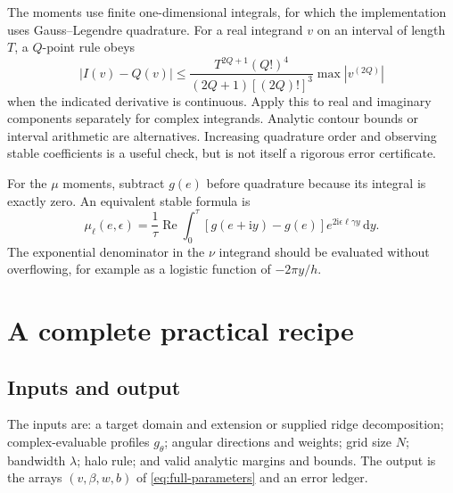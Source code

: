 \documentclass[11pt]{article}
\newcommand{\ii}{\mathrm i}
\newcommand{\dd}{\,\mathrm d}
\newcommand{\Real}{\operatorname{Re}}
\begin{document}
The moments use finite one-dimensional integrals, for which the implementation uses Gauss--Legendre quadrature. For a real integrand $v$ on an interval of length $T$, a $Q$-point rule obeys
\[
 |I(v)-Q(v)|\le
 \frac{T^{2Q+1}(Q!)^4}{(2Q+1)[(2Q)!]^3}
 \max|v^{(2Q)}|
\]
when the indicated derivative is continuous. Apply this to real and imaginary components separately for complex integrands. Analytic contour bounds or interval arithmetic are alternatives. Increasing quadrature order and observing stable coefficients is a useful check, but is not itself a rigorous error certificate.

For the $\mu$ moments, subtract $g(e)$ before quadrature because its integral is exactly zero. An equivalent stable formula is
\[
 \mu_\ell(e,\epsilon)=\frac1\tau\Real\int_0^\tau
 [g(e+\ii y)-g(e)]e^{2\ii\epsilon\ell\gamma y}\dd y.
\]
The exponential denominator in the $\nu$ integrand should be evaluated without overflowing, for example as a logistic function of $-2\pi y/h$.

\section{A complete practical recipe}
\subsection{Inputs and output}

The inputs are: a target domain and extension or supplied ridge decomposition; complex-evaluable profiles $g_\theta$; angular directions and weights; grid size $N$; bandwidth $\lambda$; halo rule; and valid analytic margins and bounds. The output is the arrays $(v,\beta,w,b)$ of \eqref{eq:full-parameters} and an error ledger.
\end{document}

